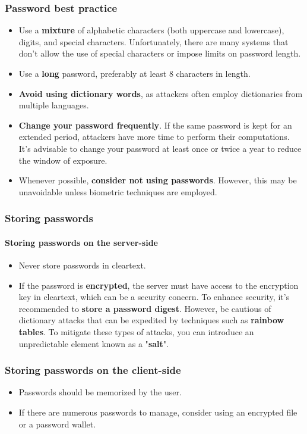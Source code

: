 \subsubsection{Password best practice}
\begin{itemize}
  \item Use a \textbf{mixture} of alphabetic characters (both uppercase and lowercase), digits, and special characters. Unfortunately, there are many systems that don't allow the use of special characters or impose limits on password length.
  \item Use a \textbf{long} password, preferably at least 8 characters in length.
  \item \textbf{Avoid using dictionary words}, as attackers often employ dictionaries from multiple languages.
  \item \textbf{Change your password frequently}. If the same password is kept for an extended period, attackers have more time to perform their computations. It's advisable to change your password at least once or twice a year to reduce the window of exposure.
  \item Whenever possible, \textbf{consider not using passwords}. However, this may be unavoidable unless biometric techniques are employed.
\end{itemize}

\subsubsection{Storing passwords}
\paragraph{Storing passwords on the server-side}
\begin{itemize}
  \item Never store passwords in cleartext.
  \item If the password is \textbf{encrypted}, the server must have access to the encryption key in cleartext, which can be a security concern. To enhance security, it's recommended to \textbf{store a password digest}. However, be cautious of dictionary attacks that can be expedited by techniques such as \textbf{rainbow tables}. To mitigate these types of attacks, you can introduce an unpredictable element known as a "\textbf{salt}".
\end{itemize}


\subsubsection{Storing passwords on the client-side}
\begin{itemize}
  \item Passwords should be memorized by the user.
  \item If there are numerous passwords to manage, consider using an encrypted file or a password wallet.
\end{itemize}



